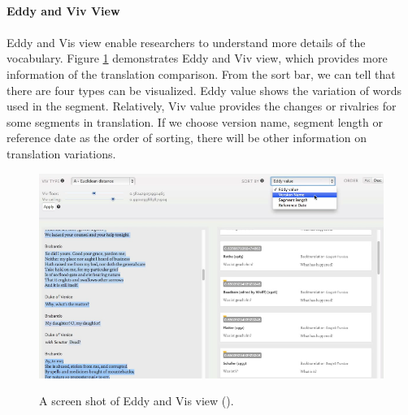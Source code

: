 \paragraph{Eddy and Viv View}
\paragraph[]{}

Eddy and Vis view enable researchers to understand more details   of the vocabulary. Figure \ref{fig:eddyVivView} demonstrates Eddy and Viv view, which provides more information of the translation comparison. From the sort bar, we can tell that there are four types can be visualized. Eddy value shows the variation of words used in the segment. Relatively, Viv value provides the changes or rivalries for some segments in translation.  If we choose version name, segment length or reference date as the order of sorting, there will be other information on translation variations. 

\begin{figure}[H] 
	\centering    
	\includegraphics[scale=0.6]{Figs/Eddy-Viv-View}\\[1ex]
	\caption{A screen shot of Eddy and Vis view (\cite{Cheesman2012}).}
	\label{fig:eddyVivView}
\end{figure} 



